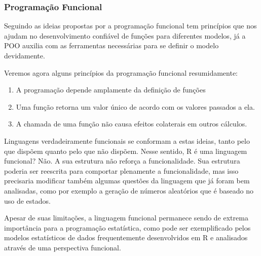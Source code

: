       \subsubsection{ Programação Funcional}
        Seguindo as ideias propostas por \cite{Chambers2014} a programação funcional tem princípios que nos ajudam no desenvolvimento confiável de funções para diferentes modelos, já a POO auxilia com as ferramentas necessárias para se definir o modelo devidamente.

        Veremos agora alguns princípios da programação funcional resumidamente:

        \begin{enumerate}
          \item A programação depende amplamente da definição de funções
          \item Uma função retorna um valor único de acordo com os valores passados a ela.
          \item A chamada de uma função não causa efeitos colaterais em outros cálculos.
        \end{enumerate}

        Linguagens verdadeiramente funcionais se conformam a estas ideias, tanto pelo que dispõem quanto pelo que não dispõem. Nesse sentido, R é uma linguagem funcional? Não. A sua estrutura não reforça a funcionalidade. Sua estrutura poderia ser reescrita para comportar plenamente a funcionalidade, mas isso precisaria modificar também algumas questões da linguagem que já foram bem analisadas, como por exemplo a geração de números aleatórios que é baseado no uso de estados.

        Apesar de suas limitações, a linguagem funcional permanece sendo de extrema importância para a programação estatística, como pode ser exemplificado pelos modelos estatísticos de dados frequentemente desenvolvidos em R e analisados através de uma perspectiva funcional.

